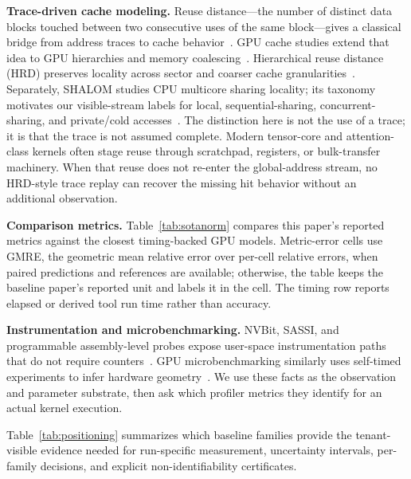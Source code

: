 \documentclass[conference]{IEEEtran}
\begin{document}
\textbf{Trace-driven cache modeling.} Reuse distance---the number of distinct
data blocks touched between two consecutive uses of the same block---gives a
classical bridge from address traces to cache behavior~\cite{mattson1970}. GPU
cache studies extend that idea to GPU hierarchies and memory
coalescing~\cite{nugteren2014gpucache,kiani2018reuse,arafa2020reuse,arafa2021pptgpu}.
Hierarchical reuse distance (HRD) preserves locality across sector and
coarser cache granularities~\cite{maeda2017hrd}. Separately, SHALOM studies
CPU multicore sharing locality; its taxonomy motivates our visible-stream
labels for local, sequential-sharing, concurrent-sharing, and private/cold
accesses~\cite{jiang2022shalom}.
The distinction here is not the use of a trace; it is that the trace is not
assumed complete. Modern tensor-core and attention-class kernels often stage
reuse through scratchpad, registers, or bulk-transfer machinery. When that reuse
does not re-enter the global-address stream, no HRD-style trace replay can
recover the missing hit behavior without an additional observation.

\textbf{Comparison metrics.} Table~\ref{tab:sotanorm} compares this paper's
reported metrics against the closest timing-backed GPU models. Metric-error
cells use GMRE, the geometric mean relative error over per-cell relative
errors, when paired predictions and references are available; otherwise, the
table keeps the baseline paper's reported unit and labels it in the cell. The
timing row reports elapsed or derived tool run time rather than accuracy.

\textbf{Instrumentation and microbenchmarking.} NVBit, SASSI, and programmable
assembly-level probes expose user-space instrumentation paths that do not
require counters~\cite{villa2019nvbit,stephenson2015sassi,huang2025neutrino}.
GPU microbenchmarking similarly uses self-timed experiments to infer hardware
geometry~\cite{wong2010demystifying,mei2017dissecting,jia2018volta,jarmusch2025blackwell}.
We use these facts as the observation and parameter substrate, then ask which
profiler metrics they identify for an actual kernel execution.

Table~\ref{tab:positioning} summarizes which baseline families provide the
tenant-visible evidence needed for run-specific measurement, uncertainty
intervals, per-family decisions, and explicit non-identifiability certificates.
\end{document}
